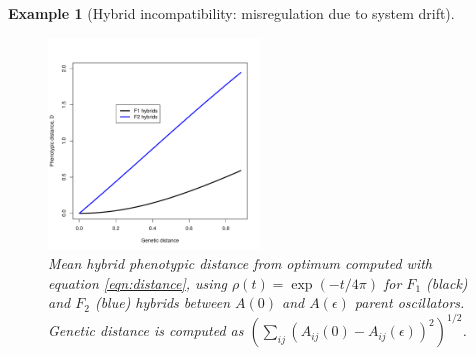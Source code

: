 \documentclass{article}
\newcommand{\1}{\mathbbm{1}}
\newtheorem{example}{Example}
\begin{document}
\begin{example}[Hybrid incompatibility: misregulation due to system drift]
  \begin{figure}[H]
    \centering
    \includegraphics[width=0.5\textwidth]{examples/F2_vs_F1_divergence_tau0}
    \caption{Mean hybrid phenotypic distance from optimum computed with equation \eqref{eqn:distance}, using $\rho(t) = \exp(-t/4\pi)$
    for $F_1$ (black) and $F_2$ (blue) hybrids between $A(0)$ and $A(\epsilon)$ parent oscillators. Genetic distance is computed as 
    $\left(\sum_{ij} (A_{ij}(0) - A_{ij}(\epsilon))^2\right)^{1/2}$.
    }
    \label{fig:osc_incompat}
  \end{figure}
\end{example}
\end{document}
